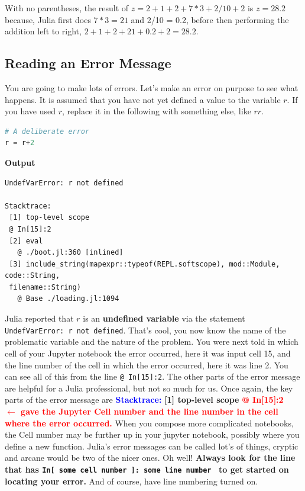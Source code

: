 \begin{rem} With no parentheses, the result of $z = 2 + 1 + 2 + 7 * 3 + 2 / 10 + 2$ is $z=28.2$ because, Julia first does $7 *3=21$ and 2/10 = 0.2, before then performing the addition left to right,  $2 + 1 + 2  + 21 + 0.2 + 2= 28.2.$
\end{rem}



\subsection{Reading an Error Message}

You are going to make lots of errors. Let's make an error on purpose to see what happens. It is assumed that you have not yet defined a value to the variable $r$. If you have used $r$, replace it in the following with something else, like $rr$.

\begin{lstlisting}[language=Julia,style=mystyle]
# A deliberate error
r = r+2
\end{lstlisting}
\textbf{Output} 
\begin{verbatim}
UndefVarError: r not defined

Stacktrace:
 [1] top-level scope
 @ In[15]:2
 [2] eval
   @ ./boot.jl:360 [inlined]
 [3] include_string(mapexpr::typeof(REPL.softscope), mod::Module, code::String,
 filename::String)
   @ Base ./loading.jl:1094
\end{verbatim}

Julia reported that $r$ is an \textbf{undefined variable} via the statement \texttt{UndefVarError: r not defined}. That's cool, you now know the name of the problematic variable and the nature of the problem. You were next told in which cell of your Jupyter notebook the error occurred, here it was input cell 15, and the line number of the cell in which the error occurred, here it was line 2. You can see all of this from the line \texttt{@ In[15]:2}. The other parts of the error message are helpful for a Julia professional, but not so much for us. Once again, the key parts of the error message are \newline
\textcolor{blue}{\bf Stacktrace:}\newline
 \textbf{[1] top-level scope} \newline
\textcolor{red}{\bf @ In[15]:2 ~~$\leftarrow$ gave the Jupyter Cell number and the line number in the cell where the error occurred.} When you compose more complicated notebooks, the Cell number may be further up in your jupyter notebook, possibly where you define a new function. Julia's error messages can be called lot's of things, cryptic and arcane would be two of the nicer ones. Oh well! \textbf{Always look for the line that has \texttt{In[ some cell number ]: some line number } to get started on locating your error.} And of course, have line numbering turned on.


